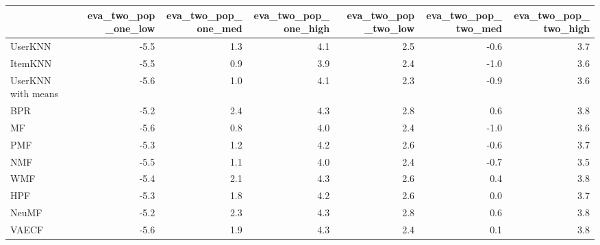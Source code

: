 \begin{tabular}{lrrrrrr}
\toprule
{} &  eva\_two\_pop\_one\_low &  eva\_two\_pop\_one\_med &  eva\_two\_pop\_one\_high &  eva\_two\_pop\_two\_low &  eva\_two\_pop\_two\_med &  eva\_two\_pop\_two\_high \\
\midrule
UserKNN            &                 -5.5 &                  1.3 &                   4.1 &                  2.5 &                 -0.6 &                   3.7 \\
ItemKNN            &                 -5.5 &                  0.9 &                   3.9 &                  2.4 &                 -1.0 &                   3.6 \\
UserKNN with means &                 -5.6 &                  1.0 &                   4.1 &                  2.3 &                 -0.9 &                   3.6 \\
BPR                &                 -5.2 &                  2.4 &                   4.3 &                  2.8 &                  0.6 &                   3.8 \\
MF                 &                 -5.6 &                  0.8 &                   4.0 &                  2.4 &                 -1.0 &                   3.6 \\
PMF                &                 -5.3 &                  1.2 &                   4.2 &                  2.6 &                 -0.6 &                   3.7 \\
NMF                &                 -5.5 &                  1.1 &                   4.0 &                  2.4 &                 -0.7 &                   3.5 \\
WMF                &                 -5.4 &                  2.1 &                   4.3 &                  2.6 &                  0.4 &                   3.8 \\
HPF                &                 -5.3 &                  1.8 &                   4.2 &                  2.6 &                  0.0 &                   3.7 \\
NeuMF              &                 -5.2 &                  2.3 &                   4.3 &                  2.8 &                  0.6 &                   3.8 \\
VAECF              &                 -5.6 &                  1.9 &                   4.3 &                  2.4 &                  0.1 &                   3.8 \\
\bottomrule
\end{tabular}
